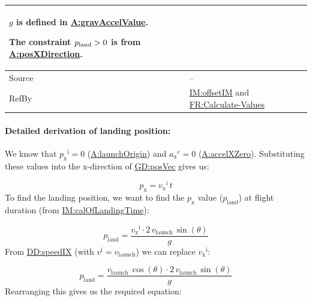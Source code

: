 \documentclass[12pt]{article}
\newcommand{\gt}{\ensuremath >}
\begin{document}
\begin{minipage}{\textwidth}
\begin{tabular}{>{\raggedright}p{}>{\raggedright\arraybackslash}p{}}
        $g$ is defined in \hyperref[gravAccelValue]{A:gravAccelValue}.
        
        The constraint ${p_{\text{land}}}\gt{}0$ is from \hyperref[posXDirection]{A:posXDirection}.
        
\\ \midrule
Source & --
         
\\ \midrule
RefBy & \hyperref[IM:offsetIM]{IM:offsetIM} and \hyperref[calcValues]{FR:Calculate-Values}
        
\\ \bottomrule
\end{tabular}
\end{minipage}

\paragraph{Detailed derivation of landing position:}
\label{IM:calOfLandingDistDeriv}
We know that ${{p_{\text{x}}}^{\text{i}}}=0$ (\hyperref[launchOrigin]{A:launchOrigin}) and ${{a_{\text{x}}}^{\text{c}}}=0$ (\hyperref[accelXZero]{A:accelXZero}). Substituting these values into the x-direction of \hyperref[GD:posVec]{GD:posVec} gives us:

\begin{displaymath}
{p_{\text{x}}}={{v_{\text{x}}}^{\text{i}}}\,t
\end{displaymath}
To find the landing position, we want to find the ${p_{\text{x}}}$ value (${p_{\text{land}}}$) at flight duration (from \hyperref[IM:calOfLandingTime]{IM:calOfLandingTime}):

\begin{displaymath}
{p_{\text{land}}}=\frac{{{v_{\text{x}}}^{\text{i}}}\cdot{}2\,{v_{\text{launch}}}\,\sin\left(θ\right)}{g}
\end{displaymath}
From \hyperref[DD:speedIX]{DD:speedIX} (with ${v^{\text{i}}}={v_{\text{launch}}}$) we can replace ${{v_{\text{x}}}^{\text{i}}}$:

\begin{displaymath}
{p_{\text{land}}}=\frac{{v_{\text{launch}}}\,\cos\left(θ\right)\cdot{}2\,{v_{\text{launch}}}\,\sin\left(θ\right)}{g}
\end{displaymath}
Rearranging this gives us the required equation:
\end{document}
